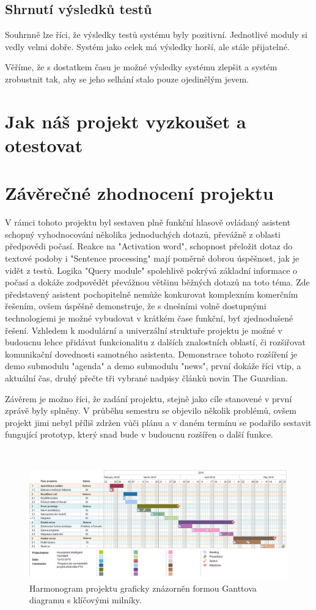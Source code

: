 \documentclass[12pt,a4paper]{article}
\begin{document}
\subsection{Shrnutí výsledků testů}
Souhrnně lze říci, že výsledky testů systému byly pozitivní. Jednotlivé moduly si vedly velmi dobře. Systém jako celek má výsledky horší, ale stále přijatelné.

Věříme, že s dostatkem času je možné výsledky systému zlepšit a systém zrobustnit tak, aby se jeho selhání stalo pouze ojedinělým jevem.



\section{Jak náš projekt vyzkoušet a otestovat}

\section{Závěrečné zhodnocení projektu}
V rámci tohoto projektu byl sestaven plně funkční hlasově ovládaný asistent schopný vyhodnocování několika jednoduchých dotazů, převážně z oblasti předpovědi počasí. Reakce na "Activation word", schopnost přeložit dotaz do textové podoby i "Sentence processing" mají poměrně dobrou úspěšnost, jak je vidět z testů. Logika "Query module" spolehlivě pokrývá základní informace o počasí a dokáže zodpovědět převážnou většinu běžných dotazů na toto téma.
Zde představený asistent pochopitelně nemůže konkurovat komplexním komerčním řešením, ovšem úspěšně demonstruje, že s dnešními volně dostupnými technologiemi je možné vybudovat v krátkém čase funkční, byť zjednodušené řešení. Vzhledem k modulární a univerzální struktuře projektu je možné v budoucnu lehce přidávat funkcionalitu z dalších znalostních oblastí, či rozšiřovat komunikační dovednosti samotného asistenta. Demonstrace tohoto rozšíření je demo submodulu "agenda" a demo submodulu "news", první dokáže říci vtip, a aktuální čas, druhý přečte tři vybrané nadpisy článků novin The Guardian.

Závěrem je možno říci, že zadání projektu, stejně jako cíle stanovené v první zprávě byly splněny. V průběhu semestru se objevilo několik problémů, ovšem projekt jimi nebyl příliš zdržen vůči plánu a v daném termínu se podařilo sestavit fungující prototyp, který snad bude v budoucnu rozšířen o další funkce.




\begin{landscape}
~\vfill
\begin{figure}[ht]
	\begin{center}
	\includegraphics[height = 0.6\textheight ]{PTO-Gantt.png}
	\caption{Harmonogram projektu graficky znázorněn formou Ganttova diagramu s klíčovými milníky.}
	\label{fig:diagram_gantt}
	\end{center}
\end{figure}
\vfill
\end{landscape}
\end{document}

